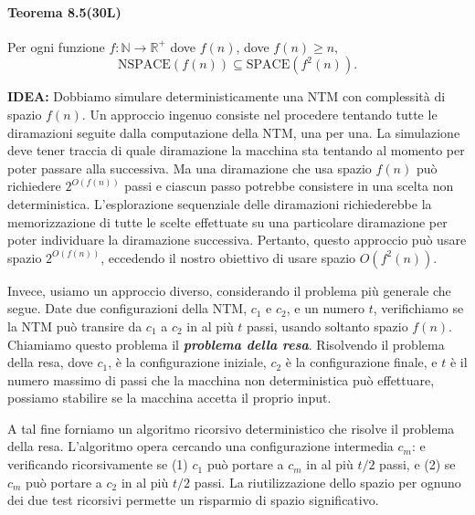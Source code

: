 \documentclass{article}
\begin{document}
\paragraph{Teorema 8.5(30L)}
\label{teorema-8.5}
\vspace{1em}
\text{}
\newline
\begin{tcolorbox}[colback=white, colframe=black!50!red, title=\textbf{Teorema di Savitch}]
    Per ogni funzione $f: \mathbb{N} \rightarrow \mathbb{R}^+$ dove $f(n)$, dove $f(n) \geq n$,
    \[
    \text{NSPACE}(f(n)) \subseteq \text{SPACE}(f^2(n)).
    \]
\end{tcolorbox}

\textbf{IDEA:}
Dobbiamo simulare deterministicamente una NTM con complessità di spazio $f(n)$.
Un approccio ingenuo consiste nel procedere tentando tutte le diramazioni seguite dalla computazione della NTM, una per una. 
La simulazione deve tener traccia di quale diramazione la macchina sta tentando al momento per poter passare alla successiva.
Ma una diramazione che usa spazio $f(n)$ può richiedere $2^{O(f(n))}$ passi e ciascun passo potrebbe consistere in una scelta non deterministica.
L'esplorazione sequenziale delle diramazioni richiederebbe la memorizzazione di tutte le scelte effettuate su una particolare diramazione per poter individuare la diramazione successiva.
Pertanto, questo approccio può usare spazio $2^{O(f(n))}$, eccedendo il
nostro obiettivo di usare spazio $O(f^2(n))$.

Invece, usiamo un approccio diverso, considerando il problema più generale che segue. 
Date due configurazioni della NTM, $c_1$ e $c_2$, e un numero $t$, verifichiamo se la NTM può transire da $c_1$ a $c_2$ in al più $t$ passi, usando soltanto spazio $f(n)$.
Chiamiamo questo problema il \textit{\textbf{problema della resa}}.
Risolvendo il problema della resa, dove $c_1$, è la configurazione iniziale, $c_2$ è la configurazione finale, e $t$ è il numero massimo di passi che la macchina non deterministica può effettuare, possiamo stabilire se la macchina accetta il proprio input.

A tal fine forniamo un algoritmo ricorsivo deterministico che risolve il problema della resa.
L'algoritmo opera cercando una configurazione intermedia $c_m$: e verificando ricorsivamente se 
(1) $c_1$ può portare a $c_m$ in al
più $t/2$ passi, e 
(2) se $c_m$ può portare a $c_2$ in al più $t/2$ passi.
La riutilizzazione dello spazio per ognuno dei due test ricorsivi permette un risparmio di spazio significativo.
\end{document}
